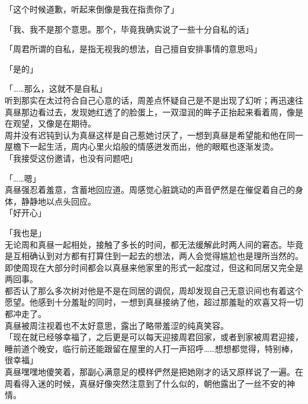 「这个时候道歉，听起来倒像是我在指责你了」

「我、我不是那个意思。那个，毕竟我确实说了一些十分自私的话」

「周君所谓的自私，是指无视我的想法，自己擅自安排事情的意思吗」

「是的」

「……那么，这就不是自私」\\

听到那实在太过符合自己心意的话，周差点怀疑自己是不是出现了幻听；再迅速往真昼那边看过去，发现她红透了的脸蛋上，一双湿润的眸子正抬起来看着周，像是在观望，又像是在期待。\\

周并没有迟钝到认为真昼这样是自己惹她讨厌了，一想到真昼是希望能和他在同一屋檐下一起生活，周内心里火焰般的情感迸发而出，他的眼眶也逐渐发烫。\\

「我接受这份邀请，也没有问题吧」

「……嗯」\\

真昼强忍着羞意，含蓄地回应道。周感觉心脏跳动的声音俨然是在催促着自己的身体，静静地以点头回应。\\

「好开心」

「我也是」\\

无论周和真昼一起相处，接触了多长的时间，都无法缓解此时两人间的窘态。毕竟是互相确认到对方都有打算住到一起去的想法，两人会觉得尴尬也是理所当然的。\\

即使周现在大部分时间都会以真昼来他家里的形式一起度过，但这和同居又完全是两回事。\\

都否认了那么多次树对他是不是在同居的调侃，周却发现自己无意识间也有着这个愿望。他感到十分羞耻的同时，一想到真昼接纳了他，超过那羞耻的欢喜又将一切都冲走了。\\

真昼被周注视着也不太好意思，露出了略带羞涩的纯真笑容。\\

「现在就已经够幸福了，之后更是可以每天迎接周君回家，或者到家被周君迎接，睡前道个晚安，临行前还能跟留在屋里的人打一声招呼……想想都觉得，特别棒，很幸福」\\

真昼嘿嘿地傻笑着，那副心满意足的模样俨然是把她刚才的话又原样说了一遍。在周看得入迷的时候，真昼好像突然注意到了什么似的，朝他露出了一丝不安的神情。\\


